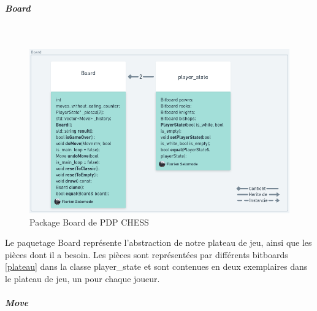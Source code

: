 \huge\documentclass{article}
\begin{document}
    \subparagraph{Board}
    ~~\\
    \newline
    \begin{figure}[!h]
        \centering
        \includegraphics[scale = 0.4]{img/Package/Board.png}
        \caption{Package Board de PDP CHESS}
        \label{pck:board}
    \end{figure}

    Le paquetage Board représente l'abstraction de notre plateau de jeu, ainsi que les pièces dont il a besoin.
    Les pièces sont représentées par différents bitboards \ref{plateau} dans la classe player\_state et sont contenues en deux exemplaires dans le plateau de jeu, un pour chaque joueur.
    \newpage

    \subparagraph{Move}
    ~~\\
    \newline
\end{document}
